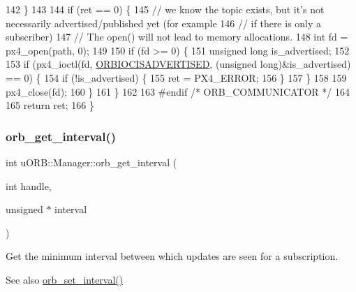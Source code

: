 \begin{DoxyCode}
142     \}
143 
144     \textcolor{keywordflow}{if} (ret == 0) \{
145         \textcolor{comment}{// we know the topic exists, but it's not necessarily advertised/published yet (for example}
146         \textcolor{comment}{// if there is only a subscriber)}
147         \textcolor{comment}{// The open() will not lead to memory allocations.}
148         \textcolor{keywordtype}{int} fd = px4\_open(path, 0);
149 
150         \textcolor{keywordflow}{if} (fd >= 0) \{
151             \textcolor{keywordtype}{unsigned} \textcolor{keywordtype}{long} is\_advertised;
152 
153             \textcolor{keywordflow}{if} (px4\_ioctl(fd, \hyperlink{drv__orb__dev_8h_a00f4a4fca062412c74b581a041c43c7a}{ORBIOCISADVERTISED}, (\textcolor{keywordtype}{unsigned} \textcolor{keywordtype}{long})&is\_advertised) == 0) \{
154                 \textcolor{keywordflow}{if} (!is\_advertised) \{
155                     ret = PX4\_ERROR;
156                 \}
157             \}
158 
159             px4\_close(fd);
160         \}
161     \}
162 
163 \textcolor{preprocessor}{#endif }\textcolor{comment}{/* ORB\_COMMUNICATOR */}\textcolor{preprocessor}{}
164 
165     \textcolor{keywordflow}{return} ret;
166 \}
\end{DoxyCode}
\mbox{\label{classuORB_1_1Manager_a627a7e6ef16970d2b6d8f02471795963}} 
\subsubsection{\texorpdfstring{orb\+\_\+get\+\_\+interval()}{orb\_get\_interval()}}
{\footnotesize\ttfamily int u\+O\+R\+B\+::\+Manager\+::orb\+\_\+get\+\_\+interval (\begin{DoxyParamCaption}\item[{int}]{handle,  }\item[{unsigned $\ast$}]{interval }\end{DoxyParamCaption})}

Get the minimum interval between which updates are seen for a subscription.

\begin{DoxySeeAlso}{See also}
\hyperlink{classuORB_1_1Manager_aade04ff2a8a3aaf275b39fc32934fc56}{orb\+\_\+set\+\_\+interval()}
\end{DoxySeeAlso}

